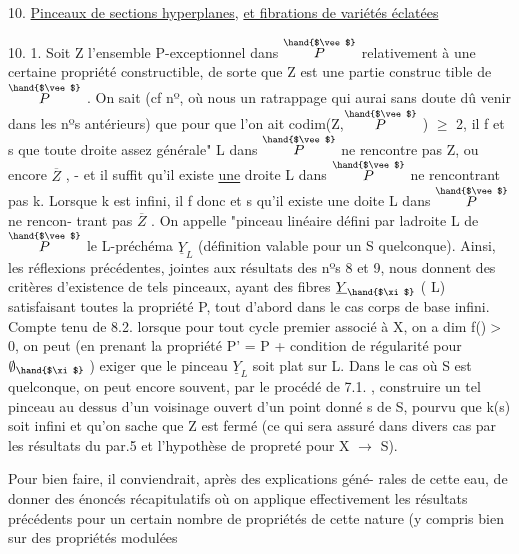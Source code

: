 
10. \uline{Pinceaux de sections hyperplanes}, \uline{et fibrations de variétés éclatées}

10. 1. Soit Z l'ensemble P-exceptionnel dans $\overset{\hand{$\vee$}}{P}$ relativement à une
certaine propriété constructible, de sorte que Z est une partie construc%
tible de $\overset{\hand{$\vee$}}{P}$ . \hand{(}\hand{)} On sait (cf nº, où nous  un ratrappage
 qui aurai sans doute dû venir dans les nºs antérieurs) que pour que
l'on ait codim(Z,$\overset{\hand{$\vee$}}{P}$ ) $\geqslant$ 2, il f et s que toute droite assez
générale" L dans $\overset{\hand{$\vee$}}{P}$ ne rencontre pas Z,  ou encore $\overline{Z}$ , - et il suffit
qu'il existe \uline{une} droite L dans $\overset{\hand{$\vee$}}{P}$ ne rencontrant pas k. Lorsque 
k est infini, il f donc et s qu'il existe une doite L dans $\overset{\hand{$\vee$}}{P}$ ne rencon-%
trant pas $\overline{Z}$ . On appelle "pinceau linéaire\hand{(}\hand{)} défini par ladroite
L de $\overset{\hand{$\vee$}}{P}$\hand{,} le L-préchéma $\underline{Y}_L$ (définition valable pour un S quelconque).
Ainsi, les réflexions précédentes, jointes aux résultats des nºs 8 et 9,
nous donnent des critères d'existence de tels pinceaux, ayant des fibres
$\underline{Y}_{\hand{$\xi$}}$ ( \hand{$\xi \in$}L) satisfaisant toutes la propriété P, tout d'abord dans le
cas  \hand{(}\hand{)} corps de base infini.  Compte tenu de
8.2.\hand{,} lorsque  pour tout cycle premier associé à X, on a dim f()$>$0,
on peut (en prenant la propriété P' = P + condition de régularité
pour $\emptyset_{\hand{$\xi$}}$ ) exiger que le pinceau $\underline{Y}_L$ soit plat sur L. Dans le cas
où S est quelconque, on peut encore souvent, par le procédé de 7.1. ,
construire un tel pinceau au dessus d'un voisinage ouvert d'un point
donné s de S, pourvu que k(s) soit infini et qu'on sache que Z est fermé
(ce qui sera assuré dans divers cas par les résultats du par.5 et
l'hypothèse de propreté pour X $\rightarrow$ S).

\margin{|} Pour bien faire, il conviendrait, après des explications géné-%
rales de cette eau, de donner des énoncés récapitulatifs où on
applique effectivement les résultats précédents pour un certain nombre
de propriétés de cette nature (y compris bien sur des propriétés modulées\hand{)}

